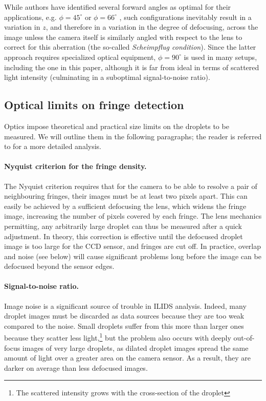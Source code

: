 \documentclass[11.5pt,oneside]{book}
\begin{document}
While authors have identified several forward angles as optimal for their
applications, e.g. $\phi = 45^\circ$ \cite{Glover95} or $\phi = 66^\circ$
\cite{Mounaim99}, such configurations inevitably result in a variation in $z$,
and therefore in a variation in the degree of defocusing, across the image unless the
camera itself is similarly angled with respect to the lens to correct for this aberration
(the so-called \emph{Scheimpflug condition}). Since the latter approach requires
specialized optical equipment, $\phi = 90^\circ$ is used in many setups,
including the one in this paper, although it is far from ideal in terms of
scattered light intensity (culminating in a suboptimal signal-to-noise ratio).

\subsection{Optical limits on fringe detection}
\label{sec:ipi-fringelimits}
Optics impose theoretical and practical size limits on the droplets to be
measured. We will outline them in the following paragraphs; the reader is
referred to \citet{Damaschke02} for a more detailed analysis.

\paragraph{Nyquist criterion for the fringe density.}
The Nyquist criterion requires that for the camera to be able to resolve a pair
of neighbouring fringes, their images must be at least two pixels apart. This
can easily be achieved by a sufficient defocusing the lens, which widens the
fringe image, increasing the number of pixels covered by each fringe. The lens
mechanics permitting, any arbitrarily large droplet can thus be measured after a
quick adjustment. In theory, this correction is effective until the defocused
droplet image is too large for the CCD sensor, and fringes are cut off. In
practice, overlap and noise (see below) will cause significant problems long
before the image can be defocused beyond the sensor edges.

\paragraph{Signal-to-noise ratio.}
Image noise is a significant source of trouble in ILIDS analysis. Indeed, many
droplet images must be discarded as data sources because they are too weak
compared to the noise.
Small droplets suffer from this more than larger ones because they scatter less
light,\footnote{The scattered intensity grows with the cross-section of the
droplet} but the problem also occurs with deeply out-of-focus images of very large
droplets, as dilated droplet images spread the same amount of light over a
greater area on the camera sensor. As a result, they are darker on average than
less defocused images. 
\end{document}

